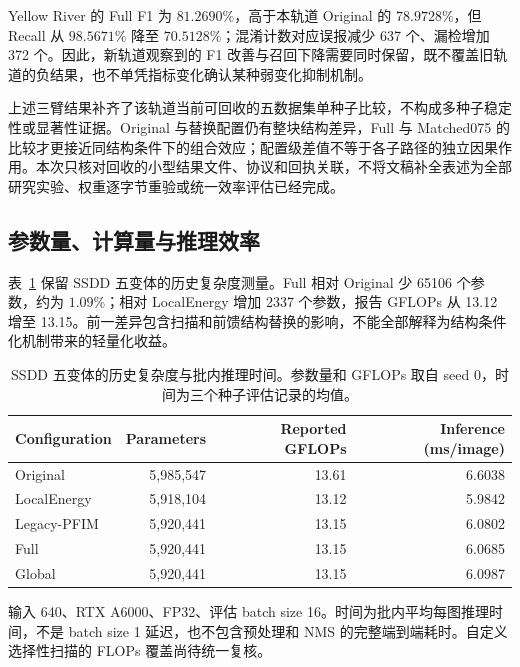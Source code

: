 \documentclass[journal]{IEEEtran}
\begin{document}
Yellow River 的 Full F1 为 $81.2690\%$，高于本轨道 Original 的 $78.9728\%$，但 Recall 从 $98.5671\%$ 降至 $70.5128\%$；混淆计数对应误报减少 637 个、漏检增加 372 个。因此，新轨道观察到的 F1 改善与召回下降需要同时保留，既不覆盖旧轨道的负结果，也不单凭指标变化确认某种弱变化抑制机制。

上述三臂结果补齐了该轨道当前可回收的五数据集单种子比较，不构成多种子稳定性或显著性证据。Original 与替换配置仍有整块结构差异，Full 与 Matched075 的比较才更接近同结构条件下的组合效应；配置级差值不等于各子路径的独立因果作用。本次只核对回收的小型结果文件、协议和回执关联，不将文稿补全表述为全部研究实验、权重逐字节重验或统一效率评估已经完成。

\FloatBarrier

\subsection{参数量、计算量与推理效率}
\label{sec:efficiency}

表~\ref{tab:complexity_ablation} 保留 SSDD 五变体的历史复杂度测量。Full 相对 Original 少 65106 个参数，约为 $1.09\%$；相对 LocalEnergy 增加 2337 个参数，报告 GFLOPs 从 13.12 增至 13.15。前一差异包含扫描和前馈结构替换的影响，不能全部解释为结构条件化机制带来的轻量化收益。

\begin{table}[!t]
\centering
\small
\setlength{\tabcolsep}{4pt}
\caption{SSDD 五变体的历史复杂度与批内推理时间。参数量和 GFLOPs 取自 seed 0，时间为三个种子评估记录的均值。}
\label{tab:complexity_ablation}
\begin{tabular*}{\textwidth}{@{\extracolsep{\fill}}lrrr}
\toprule
Configuration & Parameters & Reported GFLOPs & Inference (ms/image) \\
\midrule
Original    & 5,985,547 & 13.61 & 6.6038 \\
LocalEnergy & 5,918,104 & 13.12 & 5.9842 \\
Legacy-PFIM & 5,920,441 & 13.15 & 6.0802 \\
Full        & 5,920,441 & 13.15 & 6.0685 \\
Global      & 5,920,441 & 13.15 & 6.0987 \\
\bottomrule
\end{tabular*}
\smallskip
\begin{minipage}{\linewidth}
\footnotesize
输入 640、RTX A6000、FP32、评估 batch size 16。时间为批内平均每图推理时间，不是 batch size 1 延迟，也不包含预处理和 NMS 的完整端到端耗时。自定义选择性扫描的 FLOPs 覆盖尚待统一复核。
\end{minipage}
\end{table}
\end{document}
